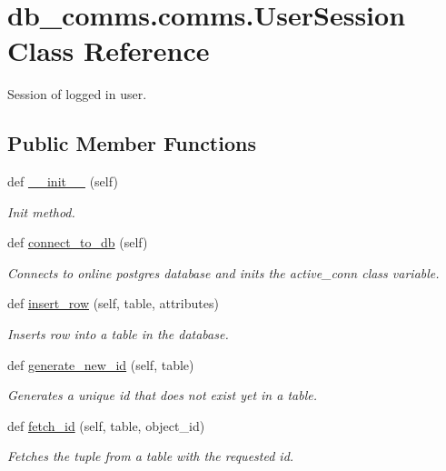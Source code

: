 \hypertarget{classdb__comms_1_1comms_1_1_user_session}{}\section{db\+\_\+comms.\+comms.\+User\+Session Class Reference}
\label{classdb__comms_1_1comms_1_1_user_session}


Session of logged in user.  


\subsection*{Public Member Functions}
\begin{DoxyCompactItemize}
\item 
def \hyperlink{classdb__comms_1_1comms_1_1_user_session_af0d64e39293129027e9b6b257c3dfe7c}{\+\_\+\+\_\+init\+\_\+\+\_\+} (self)
\begin{DoxyCompactList}\small\item\em Init method. \end{DoxyCompactList}\item 
def \hyperlink{classdb__comms_1_1comms_1_1_user_session_a1da71c707443828c6af8c32d952977d1}{connect\+\_\+to\+\_\+db} (self)
\begin{DoxyCompactList}\small\item\em Connects to online postgres database and inits the active\+\_\+conn class variable. \end{DoxyCompactList}\item 
def \hyperlink{classdb__comms_1_1comms_1_1_user_session_a9a3061ad7fe0c4e3e5d1cdfa303dddfe}{insert\+\_\+row} (self, table, attributes)
\begin{DoxyCompactList}\small\item\em Inserts row into a table in the database. \end{DoxyCompactList}\item 
def \hyperlink{classdb__comms_1_1comms_1_1_user_session_a955d49ed6f87fe0032b991cc171f2817}{generate\+\_\+new\+\_\+id} (self, table)
\begin{DoxyCompactList}\small\item\em Generates a unique id that does not exist yet in a table. \end{DoxyCompactList}\item 
def \hyperlink{classdb__comms_1_1comms_1_1_user_session_a2a44e3389a6253eb0f4aa8c2a034081d}{fetch\+\_\+id} (self, table, object\+\_\+id)
\begin{DoxyCompactList}\small\item\em Fetches the tuple from a table with the requested id. \end{DoxyCompactList}\item 

\end{DoxyCompactItemize}
